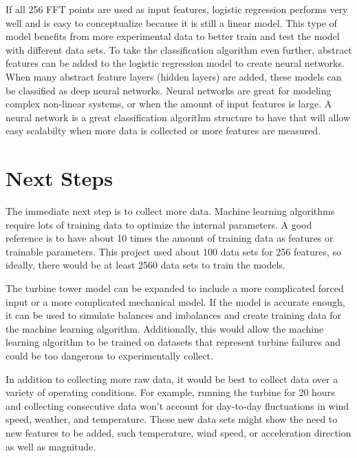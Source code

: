 If all 256 FFT points are used as input features, logistic regression performs very well and is easy to conceptualize because it is still a linear model.  This type of model benefits from more experimental data to better train and test the model with different data sets.  To take the classification algorithm even further, abstract features can be added to the logistic regression model to create neural networks.  When many abstract feature layers (hidden layers) are added, these models can be classified as deep neural networks.  Neural networks are great for modeling complex non-linear systems, or when the amount of input features is large.  A neural network is a great classification algorithm structure to have that will allow easy scalabilty when more data is collected or more features are measured.


\section{Next Steps}
The immediate next step is to collect more data.  Machine learning algorithms require lots of training data to optimize the internal parameters.  A good reference is to have about 10 times the amount of training data as features or trainable parameters.  This project used about 100 data sets for 256 features, so ideally, there would be at least 2560 data sets to train the models.

The turbine tower model can be expanded to include a more complicated forced input or a more complicated mechanical model.  If the model is accurate enough, it can be used to simulate balances and imbalances and create training data for the machine learning algorithm.  Additionally, this would allow the machine learning algorithm to be trained on datasets that represent turbine failures and could be too dangerous to experimentally collect.

In addition to collecting more raw data, it would be best to collect data over a variety of operating conditions.  For example, running the turbine for 20 hours and collecting consecutive data won't account for day-to-day fluctuations in wind speed, weather, and temperature.  These new data sets might show the need to new features to be added, such temperature, wind speed, or acceleration direction as well as magnitude.

